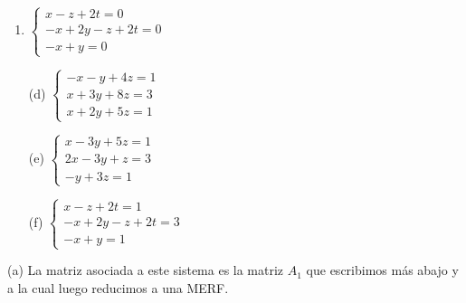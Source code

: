 \begin{enumerate}[topsep=6pt, itemsep=.4cm]
\begin{multicols}{3}
\begin{enumerate}
\item $\begin{cases}
x-z+2t = 0\\
-x+2y-z+2t = 0\\
-x+y = 0
\end{cases}$

\end{enumerate}
\end{multicols}

\begin{multicols}{3}
\begin{enumerate}

\item[(d)] $\begin{cases}
 -x - y + 4z = 1\\
 x+3y+8z = 3\\
 x+2y + 5z = 1
\end{cases}$

\item[(e)] $\begin{cases}
 x - 3y + 5z = 1\\
 2x-3y+z = 3\\
 -y + 3z = 1
\end{cases}$


\item[(f)] $\begin{cases}
x-z+2t = 1\\
-x+2y-z+2t = 3\\
-x+y = 1
\end{cases}$

\end{enumerate}
\end{multicols}

\rta

(a) La matriz asociada a este sistema es la matriz $A_1$ que escribimos más abajo y a la cual luego reducimos a una MERF.



\end{enumerate}
